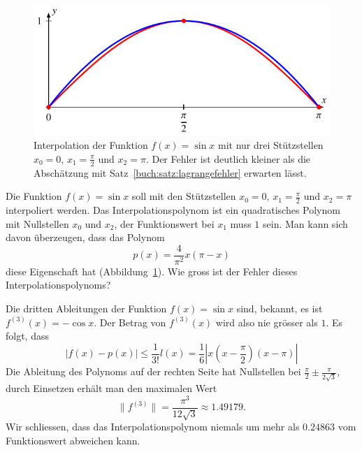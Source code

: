 \begin{beispiel}
\begin{figure}
\centering
\includegraphics{chapters/30-interpolation/figures/sin.pdf}
\caption{Interpolation der Funktion $f(x)=\sin x$ mit nur drei 
Stützstellen $x_0=0$, $x_1=\frac{\pi}2$ und $x_2=\pi$.
Der Fehler ist deutlich kleiner als die Abschätzung mit
Satz~\ref{buch:satz:lagrangefehler} erwarten lässt.
\label{buch:figure:sin}}
\end{figure}
Die Funktion $f(x)=\sin x$ soll mit den Stützstellen $x_0=0$, $x_1=\frac{\pi}2$
und $x_2=\pi$ interpoliert werden.
Das Interpolationspolynom ist ein quadratisches Polynom mit Nullstellen
$x_0$ und $x_2$, der Funktionswert bei $x_1$ muss $1$ sein.
Man kann sich davon überzeugen, dass das Polynom
\[
p(x) = \frac{4}{\pi^2} x(\pi -x )
\]
diese Eigenschaft hat (Abbildung~\ref{buch:figure:sin}).
Wie gross ist der Fehler dieses Interpolationspolynoms?

Die dritten Ableitungen der Funktion $f(x)=\sin x$ sind, bekannt, es ist
$f^{(3)}(x)=-\cos x$.
Der Betrag von $f^{(3)}(x)$ wird also nie grösser als $1$.
Es folgt, dass
\[
|f(x)-p(x)| \le \frac{1}{3!} l(x)
=
\frac16 |x(x-{\textstyle\frac{\pi}2})(x-\pi)|
\]
Die Ableitung des Polynoms auf der rechten Seite hat Nullstellen bei
$\frac{\pi}2 \pm \frac{\pi}{2\sqrt{3}}$,
durch Einsetzen erhält man den maximalen Wert
\[
\|f^{(3)}\|
=
\frac{\pi^3}{12\sqrt{3}}\approx 1.49179.
\]
Wir schliessen, dass das Interpolationspolynom niemals um mehr als $0.24863$
vom Funktionswert abweichen kann.
\end{beispiel}

%
%
